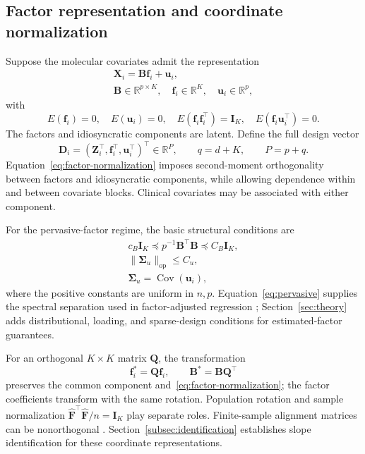 \subsection{Factor representation and coordinate normalization}
\label{subsec:factors}
Suppose the molecular covariates admit the representation
\begin{equation}
 \begin{gathered}
\bm{X}_i=\bm{B}\bm{f}_i+\bm{u}_i,\\
 \bm{B}\in\mathbb R^{p\times K},\quad
 \bm{f}_i\in\mathbb R^K,\quad \bm{u}_i\in\mathbb R^p,
 \end{gathered}
 \label{eq:factor-model}
\end{equation}
with
\begin{equation}
 E(\bm{f}_i)=0,\quad E(\bm{u}_i)=0,\quad
 E(\bm{f}_i\bm{f}_i^\top)=\bm{I}_K,\quad E(\bm{f}_i\bm{u}_i^\top)=0.
 \label{eq:factor-normalization}
\end{equation}
The factors and idiosyncratic components are latent. Define the full design vector
\[
 \bm{D}_i=(\bm{Z}_i^\top,\bm{f}_i^\top,\bm{u}_i^\top)^\top\in\mathbb R^P,
 \qquad q=d+K,\qquad P=p+q.
\]
Equation~\eqref{eq:factor-normalization} imposes second-moment orthogonality between factors and idiosyncratic components, while allowing dependence within and between covariate blocks. Clinical covariates may be associated with either component.

For the pervasive-factor regime, the basic structural conditions are
\begin{equation}
 \begin{gathered}
c_B \bm{I}_K\preceq p^{-1}\bm{B}^\top \bm{B}\preceq C_B \bm{I}_K,
 \\
 \|\bm{\Sigma}_u\|_{\mathrm{op}}\le C_u,
 \\
 \bm{\Sigma}_u=\operatorname{Cov}(\bm{u}_i),
 \end{gathered}
 \label{eq:pervasive}
\end{equation}
where the positive constants are uniform in $n,p$. Equation~\eqref{eq:pervasive} supplies the spectral separation used in factor-adjusted regression \citep{FanEtAl2020}; Section~\ref{sec:theory} adds distributional, loading, and sparse-design conditions for estimated-factor guarantees.

For an orthogonal $K\times K$ matrix $\bm{Q}$, the transformation
\begin{equation}
 \bm{f}_i^*=\bm{Q}\bm{f}_i,\qquad \bm{B}^*=\bm{B}\bm{Q}^\top
 \label{eq:factor-rotation}
\end{equation}
preserves the common component and~\eqref{eq:factor-normalization}; the factor coefficients transform with the same rotation. Population rotation and sample normalization $\widehat{\bm{F}}^\top\widehat{\bm{F}}/n=\bm{I}_K$ play separate roles. Finite-sample alignment matrices can be nonorthogonal \citep{BaiNg2013}. Section~\ref{subsec:identification} establishes slope identification for these coordinate representations.

